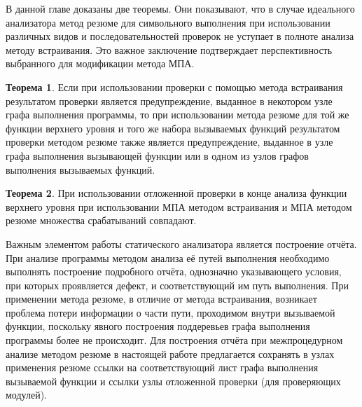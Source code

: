 В данной главе доказаны две теоремы. Они показывают, что в случае идеального анализатора метод резюме для символьного выполнения при использовании различных видов и последовательностей проверок не уступает в полноте анализа методу встраивания. Это важное заключение подтверждает перспективность выбранного для модификации метода МПА.

\textbf{Теорема 1}. Если при использовании проверки с помощью метода встраивания результатом проверки является предупреждение, выданное в некотором узле графа выполнения программы, то при использовании метода резюме для той же функции верхнего уровня и того же набора вызываемых функций результатом проверки методом резюме также является предупреждение, выданное в узле графа выполнения вызывающей функции или в одном из узлов графов выполнения вызываемых функций.

\textbf{Теорема 2}. При использовании отложенной проверки в конце анализа функции верхнего уровня при использовании МПА методом встраивания и МПА методом резюме множества срабатываний совпадают.

Важным элементом работы статического анализатора является построение отчёта. При анализе программы методом анализа её путей выполнения необходимо выполнять построение подробного отчёта, однозначно указывающего условия, при которых проявляется дефект, и соответствующий им путь выполнения. При применении метода резюме, в отличие от метода встраивания, возникает проблема потери информации о части пути, проходимом внутри вызываемой функции, поскольку явного построения поддеревьев графа выполнения программы более не происходит. Для построения отчёта  при межпроцедурном анализе методом резюме в настоящей работе предлагается сохранять в узлах применения резюме ссылки на соответствующий лист графа выполнения вызываемой функции и ссылки узлы отложенной проверки (для проверяющих модулей).


